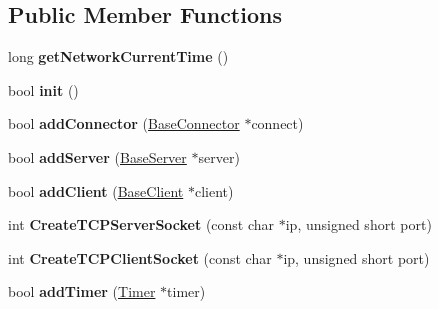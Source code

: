 \subsection*{Public Member Functions}
\begin{DoxyCompactItemize}
\item 
\mbox{\label{class_c_g_1_1_network_ad78402e19997627dfdc66acc8d692454}} 
long {\bfseries get\+Network\+Current\+Time} ()
\item 
\mbox{\label{class_c_g_1_1_network_a8d3dc68aa1225515c64452fb6959ed4f}} 
bool {\bfseries init} ()
\item 
\mbox{\label{class_c_g_1_1_network_a2ee44c8a4cc822642315e22e8c6752e3}} 
bool {\bfseries add\+Connector} (\mbox{\hyperlink{class_c_g_1_1_base_connector}{Base\+Connector}} $\ast$connect)
\item 
\mbox{\label{class_c_g_1_1_network_a9bfaa8c8baf2cabe501b03e425b9b95a}} 
bool {\bfseries add\+Server} (\mbox{\hyperlink{class_c_g_1_1_base_server}{Base\+Server}} $\ast$server)
\item 
\mbox{\label{class_c_g_1_1_network_af1718e351ac7f026414854c082cac37c}} 
bool {\bfseries add\+Client} (\mbox{\hyperlink{class_c_g_1_1_base_client}{Base\+Client}} $\ast$client)
\item 
\mbox{\label{class_c_g_1_1_network_a866f5d6275992de290a5e9754c526e6a}} 
int {\bfseries Create\+T\+C\+P\+Server\+Socket} (const char $\ast$ip, unsigned short port)
\item 
\mbox{\label{class_c_g_1_1_network_a7caa058a41315430ba5dc051739bf3df}} 
int {\bfseries Create\+T\+C\+P\+Client\+Socket} (const char $\ast$ip, unsigned short port)
\item 
\mbox{\label{class_c_g_1_1_network_ab9d768fbb1ffe711c3bf7e1fa38c12ee}} 
bool {\bfseries add\+Timer} (\mbox{\hyperlink{class_c_g_1_1_timer}{Timer}} $\ast$timer)
\item 
\mbox{\label{class_c_g_1_1_network_a5db4a0eed7fa669c64ab1fdacb75a9de}} 

\end{DoxyCompactItemize}
